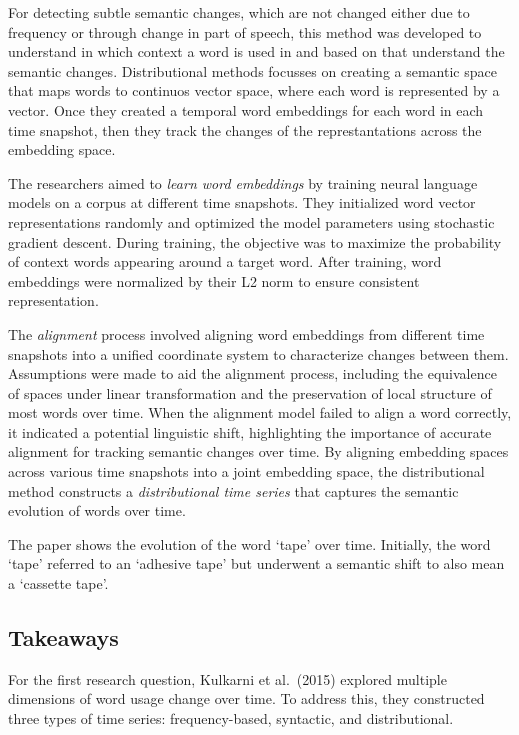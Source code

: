 For detecting subtle semantic changes, which are not changed either due to frequency or through change in part of speech,
this method was developed to understand in which context a word is used in and based on that understand the semantic changes.
Distributional methods focusses on creating a semantic space that maps words to continuos vector space, where each word is represented by a vector.
Once they created a temporal word embeddings for each word in each time snapshot, then they track the changes of the represtantations across the embedding space.

The researchers aimed to \emph{learn word embeddings} by training neural language models on a corpus at different time snapshots.
They initialized word vector representations randomly and optimized the model parameters using stochastic gradient descent.
During training, the objective was to maximize the probability of context words appearing around a target word.
After training, word embeddings were normalized by their L2 norm to ensure consistent representation.

The \emph{alignment} process involved aligning word embeddings from different time snapshots into a unified coordinate system to characterize changes between them.
Assumptions were made to aid the alignment process, including the equivalence of spaces under linear transformation and the preservation of local structure of most words over time.
When the alignment model failed to align a word correctly, it indicated a potential linguistic shift, highlighting the importance of accurate alignment for tracking semantic changes over time.
By aligning embedding spaces across various time snapshots into a joint embedding space,
the distributional method constructs a \emph{distributional time series} that captures the semantic evolution of words over time.

The paper shows the evolution of the word `tape' over time.
Initially, the word `tape' referred to an `adhesive tape' but underwent a semantic shift to also mean a `cassette tape'.

\subsection{Takeaways}\label{subsec:takeaways}
For the first research question, Kulkarni et al.\ (2015) explored multiple dimensions of word usage change over time.
To address this, they constructed three types of time series: frequency-based, syntactic, and distributional.

